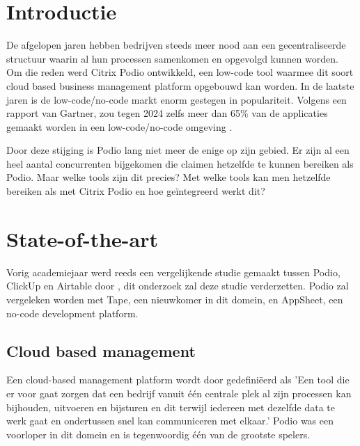 
\section{Introductie}%
\label{sec:introductie}

De afgelopen jaren hebben bedrijven steeds meer nood aan een gecentraliseerde structuur waarin al hun processen samenkomen en opgevolgd kunnen worden. Om die reden werd Citrix Podio ontwikkeld, een low-code tool waarmee dit soort cloud based business management platform opgebouwd kan worden. In de laatste jaren is de low-code/no-code markt enorm gestegen in populariteit. Volgens een rapport van Gartner, zou tegen 2024 zelfs meer dan 65\% van de applicaties gemaakt worden in een low-code/no-code omgeving \autocite{Costello2021}.

Door deze stijging is Podio lang niet meer de enige op zijn gebied. Er zijn al een heel aantal concurrenten bijgekomen die claimen hetzelfde te kunnen bereiken als Podio. Maar welke tools zijn dit precies? Met welke tools kan men hetzelfde bereiken als met Citrix Podio en hoe geïntegreerd werkt dit?  


\section{State-of-the-art}%
\label{sec:state-of-the-art}

 Vorig academiejaar werd reeds een vergelijkende studie gemaakt tussen Podio, ClickUp en Airtable door \textcite{Spitaels2022}, dit onderzoek zal deze studie verderzetten. Podio zal vergeleken worden met Tape, een nieuwkomer in dit domein, en AppSheet, een no-code development platform.
 
\subsection{Cloud based management}

Een cloud-based management platform wordt door \textcite{Spitaels2022} gedefiniëerd als 'Een tool die er voor gaat zorgen dat een bedrijf vanuit één centrale plek al zijn processen kan bijhouden, uitvoeren en bijsturen en dit terwijl iedereen met dezelfde data te werk gaat en ondertussen snel kan communiceren met elkaar.'
Podio was een voorloper in dit domein en is tegenwoordig één van de grootste spelers.


